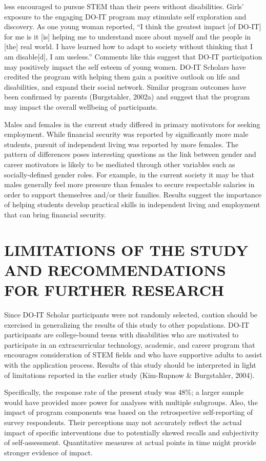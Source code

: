 \documentclass[11.5pt]{sig-alternate} %
\begin{document}
\begin{large}
less encouraged to pursue STEM than their peers without disabilities. Girls’ exposure to the engaging DO-IT program may stimulate self exploration and discovery. As one young woman reported, “I think the greatest impact [of DO-IT] for me is it [is] helping me to understand more about myself and the people in [the] real world. I have learned how to adapt to society without thinking that I am disable[d], I am useless.” Comments like this suggest that DO-IT participation may positively impact the self esteem of young women. DO-IT Scholars have credited the program with helping them gain a positive outlook on life and disabilities, and expand their social network. Similar program outcomes have been confirmed by parents (Burgstahler, 2002a) and suggest that the program may impact the overall wellbeing of participants. %
 
Males and females in the current study differed in primary motivators for seeking employment. While financial security was reported by significantly more male students, pursuit of independent living was reported by more females. The pattern of differences poses interesting questions as the link between gender and career motivators is likely to be mediated through other variables such as socially-defined gender roles. For example, in the current society it may be that males generally feel more pressure than females to secure respectable salaries in order to support themselves and/or their families. Results suggest the importance of helping students develop practical skills in independent living and employment that can bring financial security. 
 
\section*{LIMITATIONS OF THE STUDY AND RECOMMENDATIONS FOR FURTHER RESEARCH }
 
Since DO-IT Scholar participants were not randomly selected, caution should be exercised in generalizing the results of this study to other populations. DO-IT participants are college-bound teens with disabilities who are motivated to participate in an extracurricular technology, academic, and career program that encourages consideration of STEM fields and who have supportive adults to assist with the application process. Results of this study should be interpreted in light of limitations reported in the earlier study (Kim-Rupnow \& Burgstahler, 2004). 

Specifically, the response rate of the present study was 48\%; a larger sample would have provided more power for analyses with multiple subgroups. Also, the impact of program components was based on the retrospective self-reporting of survey respondents. Their perceptions may not accurately reflect the actual impact of specific interventions due to potentially skewed recalls and subjectivity of self-assessment. Quantitative measures at actual points in time might provide stronger evidence of impact.  
 

\end{large}
\end{document}
